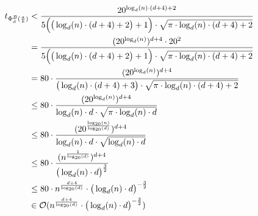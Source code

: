 \documentclass{article}
\theoremstyle{nonumberplain}
\begin{document}
\begin{align*}
    t_{\Phi_{d}^{B}(\frac{a}{b})}
    &< \frac{20^{\log_d(n)\cdot(d+4)+2}}{5\Big(\big(\log_d(n) \cdot (d+4)+2\big)+1\Big) \cdot \sqrt{\pi \cdot \log_d(n) \cdot (d+4) + 2}} \\
    &= \frac{(20^{\log_d(n)})^{d+4}\cdot20^2}{5\Big(\big(\log_d(n) \cdot (d+4)+2\big)+1\Big) \cdot \sqrt{\pi \cdot \log_d(n) \cdot (d + 4) + 2}} \\
    &= 80\cdot\frac{(20^{\log_d(n)})^{d+4}}{\big(\log_d(n) \cdot (d+4)+3\big) \cdot\sqrt{\pi \cdot \log_d(n)\cdot(d+4)+2}} \\
    &\leq 80\cdot\frac{(20^{\log_d(n)})^{d+4}}{\log_d(n) \cdot d \cdot \sqrt{\pi \cdot \log_d(n) \cdot d}} \\
    &\leq 80\cdot\frac{(20^{\frac{\log_{20}(n)}{\log_{20}(d)}})^{d+4}}{\log_d(n) \cdot d \cdot \sqrt{\log_d(n) \cdot d}} \\
    &\leq 80\cdot\frac{(n^{\frac{1}{\log_{20}(d)}})^{d+4}}{\big(\log_d(n) \cdot d\big)^{\frac{3}{2}}} \\
    &\leq 80 \cdot n^{\frac{d+4}{\log_{20}(d)}} \cdot \big(\log_d(n) \cdot d\big)^{-\frac{3}{2}} \\
    &\in \mathcal{O}(n^{\frac{d+4}{\log_{20}(d)}} \cdot \big(\log_d(n) \cdot d\big)^{-\frac{3}{2}}) \\
\end{align*}
\end{document}
